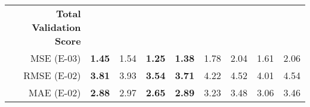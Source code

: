 \begin{table}[htbp]
\begin{tabular}{r|cccccccc}
        \textbf{Total Validation Score         } &       &       &       &       &       &       &       &  \\
        MSE (E-03)   & \textbf{1.45} & 1.54  & \textbf{1.25} & \textbf{1.38} & 1.78  & 2.04  & 1.61  & 2.06 \\
        RMSE (E-02)   & \textbf{3.81} & 3.93  & \textbf{3.54} & \textbf{3.71} & 4.22  & 4.52  & 4.01  & 4.54 \\
        MAE (E-02)   & \textbf{2.88} & 2.97  & \textbf{2.65} & \textbf{2.89} & 3.23  & 3.48  & 3.06  & 3.46 \\
    \end{tabular}%
  \label{table5}%
\end{table}%




